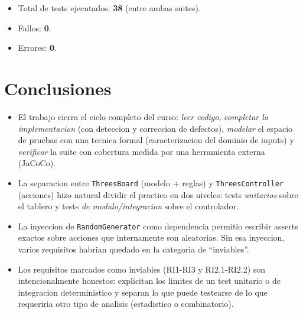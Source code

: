 \documentclass[12pt,a4paper]{article}
\begin{document}
\begin{itemize}
  \item Total de tests ejecutados: \textbf{38} (entre ambas suites).
  \item Fallos: \textbf{0}.
  \item Errores: \textbf{0}.
\end{itemize}

\section*{Conclusiones}

\begin{itemize}
  \item El trabajo cierra el ciclo completo del curso: \emph{leer codigo}, \emph{completar
  la implementacion} (con deteccion y correccion de defectos), \emph{modelar} el espacio
  de pruebas con una tecnica formal (caracterizacion del dominio de inputs) y
  \emph{verificar} la suite con cobertura medida por una herramienta externa (JaCoCo).
  \item La separacion entre \texttt{ThreesBoard} (modelo + reglas) y \texttt{ThreesController}
  (acciones) hizo natural dividir el practico en dos niveles: tests \emph{unitarios} sobre el
  tablero y tests \emph{de modulo/integracion} sobre el controlador.
  \item La inyeccion de \texttt{RandomGenerator} como dependencia permitio escribir asserts
  exactos sobre acciones que internamente son aleatorias. Sin esa inyeccion, varios
  requisitos habrian quedado en la categoria de ``inviables''.
  \item Los requisitos marcados como inviables (RI1-RI3 y RI2.1-RI2.2) son intencionalmente
  honestos: explicitan los limites de un test unitario o de integracion deterministico y
  separan lo que puede testearse de lo que requeriria otro tipo de analisis (estadistico o
  combinatorio).
\end{itemize}
\end{document}

